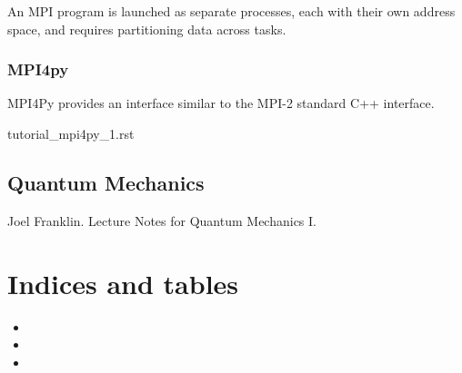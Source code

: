 \documentclass[letterpaper,10pt,english]{sphinxmanual}
\begin{document}
An MPI program is launched as separate processes, each with their own address space, and requires partitioning data across tasks.


\subsection{MPI4py}
\label{\detokenize{mpi/index:mpi4py}}
MPI4Py provides an interface similar to the MPI-2 standard C++ interface.

tutorial\_mpi4py\_1.rst



\section{Quantum Mechanics}
\label{\detokenize{qm/index:quantum-mechanics}}\label{\detokenize{qm/index::doc}}
Joel Franklin.  Lecture Notes for Quantum Mechanics I.  


\chapter{Indices and tables}
\label{\detokenize{index:indices-and-tables}}\begin{itemize}
\item {} 

\item {} 

\item {} 

\end{itemize}
\end{document}
